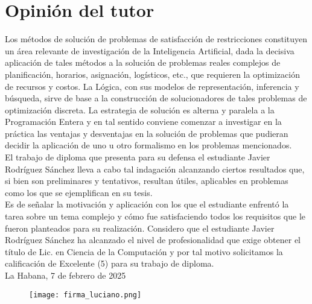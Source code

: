 \documentclass[12pt]{report}
\begin{document}
\newpage
\begingroup
\setlength{\parindent}{0pt}

\section*{Opinión del tutor}
Los métodos de solución de problemas de satisfacción de restricciones constituyen un área relevante de investigación de la Inteligencia Artificial, dada la decisiva aplicación de tales métodos a la solución de problemas reales complejos de planificación, horarios, asignación, logísticos, etc., que requieren la optimización de recursos y costos. La Lógica, con sus modelos de representación, inferencia y búsqueda, sirve de base a la construcción de solucionadores de tales problemas de optimización discreta. La estrategia de solución es alterna y paralela a la Programación Entera y en tal sentido conviene comenzar a investigar en la práctica las ventajas y desventajas en la solución de problemas que pudieran decidir la aplicación de uno u otro formalismo en los problemas mencionados.\\

El trabajo de diploma que presenta para su defensa el estudiante Javier Rodríguez Sánchez lleva a cabo tal indagación alcanzando ciertos resultados que, si bien son preliminares y tentativos, resultan útiles, aplicables en problemas como los que se ejemplifican en su tesis.\\

Es de señalar la motivación y aplicación con los que el estudiante enfrentó la tarea sobre un tema complejo y cómo fue satisfaciendo todos los requisitos que le fueron planteados para su realización. Considero que el estudiante Javier Rodríguez Sánchez ha alcanzado el nivel de profesionalidad que exige obtener el título de Lic. en Ciencia de la Computación y por tal motivo solicitamos la calificación de Excelente (5) para su trabajo de diploma.\\

La Habana, 7 de febrero de 2025

\begin{figure}[ht]
    \texttt{[image: firma\_luciano.png]}
\end{figure}

\endgroup
\newpage
\end{document}
